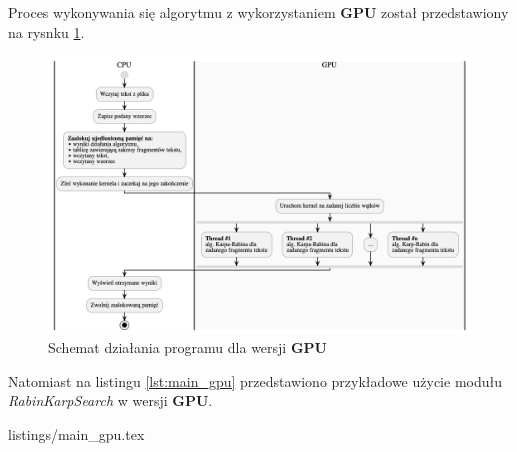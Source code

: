 Proces wykonywania się algorytmu z wykorzystaniem \textbf{GPU} został przedstawiony na rysnku \ref{fig:flow_chart}.
\begin{figure}[H]
    \centering
    \includegraphics[width=\linewidth]{images/uml/FlowChart.png}
    \caption{Schemat działania programu dla wersji \textbf{GPU}}
    \label{fig:flow_chart}
\end{figure}

\newpage
Natomiast na listingu \ref{lst:main_gpu} przedstawiono przykładowe użycie modułu \textit{RabinKarpSearch} w wersji \textbf{GPU}.
\begin{lstinputlisting}[language=C++, label=lst:main_gpu, caption=Przykładowe użycie modułu \textit{RabinKarpSearch} w wersji \textbf{GPU}]{listings/main_gpu.tex}
\end{lstinputlisting}